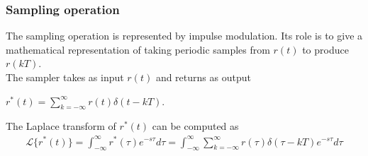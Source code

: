 \begin{frame}
	\frametitle{Sampling operation}
	\begin{block}{}
	The sampling operation is represented by impulse modulation. Its role is to give a mathematical representation of taking periodic samples from $r(t)$ to produce $r(kT)$. \\
	\vspace{1em}
	The sampler takes as input $r(t)$ and returns as output
	\begin{center}
	$r^*(t)=\sum_{k=-\infty}^{\infty} r(t)\delta(t-kT)$.
	\end{center}
	\vspace{1em}
	The Laplace transform of $r^*(t)$ can be computed as\\
	\vspace{-1.5em}
	\begin{align*} 
	\mathcal{L}\{r^*(t)\} = \int_{-\infty}^{\infty} r^*(\tau)e^{-s\tau} d\tau = \int_{-\infty}^{\infty} \sum_{k=-\infty}^{\infty} r(\tau)\delta(\tau-kT)e^{-s\tau}d\tau 
	\end{align*}\\
	\end{block}
\end{frame}

